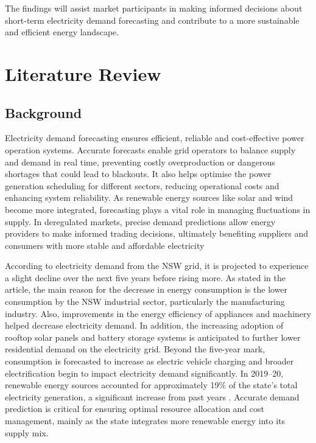\documentclass[mstat,12pt]{unswthesis}
\begin{document}
The findings will assist market participants in making informed
decisions about short-term electricity demand forecasting and contribute
to a more sustainable and efficient energy landscape.

\bigskip

\hypertarget{literature-review}{%
\chapter{Literature Review}\label{literature-review}}

\hypertarget{background}{%
\section{Background}\label{background}}

Electricity demand forecasting ensures efficient, reliable and
cost-effective power operation systems. Accurate forecasts enable grid
operators to balance supply and demand in real time, preventing costly
overproduction or dangerous shortages that could lead to blackouts. It
also helps optimise the power generation scheduling for different
sectors, reducing operational costs and enhancing system reliability. As
renewable energy sources like solar and wind become more integrated,
forecasting plays a vital role in managing fluctuations in supply. In
deregulated markets, precise demand predictions allow energy providers
to make informed trading decisions, ultimately benefiting suppliers and
consumers with more stable and affordable electricity

According to \cite{nsw_epa_2021_energy_consumption} electricity demand
from the NSW grid, it is projected to experience a slight decline over
the next five years before rising more. As stated in the article, the
main reason for the decrease in energy consumption is the lower
consumption by the NSW industrial sector, particularly the manufacturing
industry. Also, improvements in the energy efficiency of appliances and
machinery helped decrease electricity demand. In addition, the
increasing adoption of rooftop solar panels and battery storage systems
is anticipated to further lower residential demand on the electricity
grid. Beyond the five-year mark, consumption is forecasted to increase
as electric vehicle charging and broader electrification begin to impact
electricity demand significantly. In 2019--20, renewable energy sources
accounted for approximately 19\% of the state's total electricity
generation, a significant increase from past years
\cite{nsw_epa_2021_energy_consumption}. Accurate demand prediction is
critical for ensuring optimal resource allocation and cost management,
mainly as the state integrates more renewable energy into its supply
mix.
\end{document}
